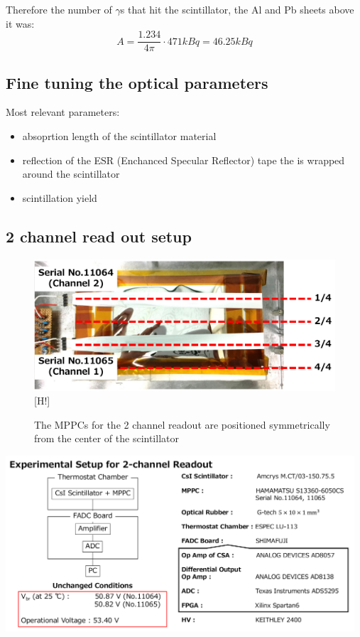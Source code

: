 \documentclass[12pt, a4paper,titlepage]{article}
\numberwithin{equation}{section}
\numberwithin{figure}{section}
\begin{document}
 Therefore the number of $\gamma$s that hit the scintillator, the Al and Pb sheets above it was:
$$A = \frac{1.234}{4 \pi} \cdot 471 kBq = 46.25 kBq$$



\subsection{Fine tuning the optical parameters}

Most relevant parameters:
\begin{itemize}
\item absoprtion length of the scintillator material
\item reflection of the ESR (Enchanced Specular Reflector) tape the is wrapped around the scintillator 
\item scintillation yield
\end{itemize}

\pagebreak

\subsection{2 channel read out setup}

\begin{figure}
\centering
\includegraphics[width=130.0mm]{images/2channelsetup.png}[H!]
\caption{The MPPCs for the 2 channel readout are positioned symmetrically from the center of the scintillator}
\end{figure}

\includegraphics[width=130.0mm]{images/2channelelectronics.png}
\end{document}
